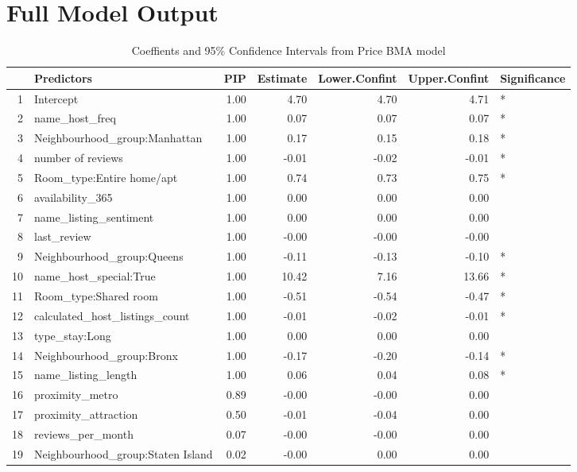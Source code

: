 \documentclass[10pt]{jmlr}%
\begin{document}
\newpage  %


\section{Full Model Output}





\begin{table}[ht]
\centering
\begin{tabular}{rlrrrrl}
  \hline
 & Predictors & PIP & Estimate & Lower.Confint & Upper.Confint & Significance \\ 
  \hline
1 & Intercept & 1.00 & 4.70 & 4.70 & 4.71 & * \\ 
  2 & name\_host\_freq & 1.00 & 0.07 & 0.07 & 0.07 & * \\ 
  3 & Neighbourhood\_group:Manhattan & 1.00 & 0.17 & 0.15 & 0.18 & * \\ 
  4 & number of reviews & 1.00 & -0.01 & -0.02 & -0.01 & * \\ 
  5 & Room\_type:Entire home/apt & 1.00 & 0.74 & 0.73 & 0.75 & * \\ 
  6 & availability\_365 & 1.00 & 0.00 & 0.00 & 0.00 &  \\ 
  7 & name\_listing\_sentiment & 1.00 & 0.00 & 0.00 & 0.00 &  \\ 
  8 & last\_review & 1.00 & -0.00 & -0.00 & -0.00 &  \\ 
  9 & Neighbourhood\_group:Queens & 1.00 & -0.11 & -0.13 & -0.10 & * \\ 
  10 & name\_host\_special:True & 1.00 & 10.42 & 7.16 & 13.66 & * \\ 
  11 & Room\_type:Shared room & 1.00 & -0.51 & -0.54 & -0.47 & * \\ 
  12 & calculated\_host\_listings\_count & 1.00 & -0.01 & -0.02 & -0.01 & * \\ 
  13 & type\_stay:Long & 1.00 & 0.00 & 0.00 & 0.00 &  \\ 
  14 & Neighbourhood\_group:Bronx & 1.00 & -0.17 & -0.20 & -0.14 & * \\ 
  15 & name\_listing\_length & 1.00 & 0.06 & 0.04 & 0.08 & * \\ 
  16 & proximity\_metro & 0.89 & -0.00 & -0.00 & 0.00 &  \\ 
  17 & proximity\_attraction & 0.50 & -0.01 & -0.04 & 0.00 &  \\ 
  18 & reviews\_per\_month & 0.07 & -0.00 & -0.00 & 0.00 &  \\ 
  19 & Neighbourhood\_group:Staten Island & 0.02 & -0.00 & 0.00 & 0.00 &  \\ 
   \hline
\end{tabular}
\caption{Coeffients and 95\% Confidence Intervals from Price BMA model} 
\end{table}


	

\newpage



\end{document}
